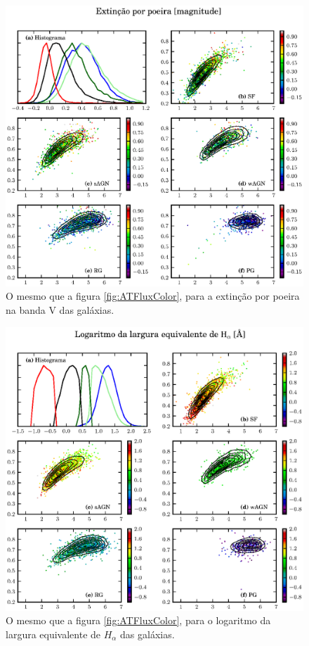 \begin{figure}
	\includegraphics{figuras/uvcolor-color-AV-byclass.eps}
	\caption[Absorção por poeira no diagrama cor--cor UV.]
	{O mesmo que a figura \ref{fig:ATFluxColor}, para a extinção por
	poeira na banda V das galáxias.}
	\label{fig:AVColor}
\end{figure}

\begin{figure}
	\includegraphics{figuras/uvcolor-color-halpha_ew-byclass.eps}
	\caption[Largura equivalente de $H_{\alpha}$ no diagrama cor--cor UV.]
	{O mesmo que a figura \ref{fig:ATFluxColor}, para o logaritmo da largura
	equivalente de $H_{\alpha}$ das galáxias.}
	\label{fig:EWHaColor}
\end{figure}


